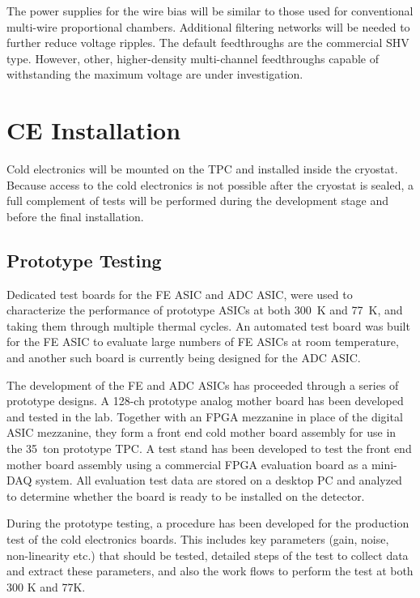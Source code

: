 The power supplies for the wire bias will be similar to 
those used for conventional multi-wire proportional chambers. 
Additional filtering networks will 
be needed to further reduce voltage ripples.  
The default feedthroughs are the commercial SHV type.  
However,  other, higher-density multi-channel 
feedthroughs capable of withstanding the maximum voltage are under investigation.  

%
\section{CE Installation}
\label{sec:ce_install}

Cold electronics will be mounted on the TPC and installed inside the cryostat.
Because access to the cold electronics is not possible after the cryostat is sealed,
a full complement of tests will be performed during the development stage and before the final installation.

\subsection{Prototype Testing}
\label{sec:ce_install_proto}

Dedicated test boards for the FE ASIC and ADC ASIC,
were used to characterize the performance of prototype ASICs at both 300~K and 77~K,
and taking them through multiple thermal cycles.
An automated test board was built for the FE ASIC to evaluate large numbers of FE ASICs at room temperature,
and another such board is currently being designed for the ADC ASIC.

The development of the FE and ADC ASICs has proceeded through a series of prototype designs.
A 128-ch prototype analog mother board has been developed and tested in the lab.
Together with an FPGA mezzanine in place of the digital ASIC mezzanine,
they form a front end cold mother board assembly for use in the 35~ton prototype TPC.
A test stand has been developed to test the front end mother board assembly
using a commercial FPGA evaluation board as a mini-DAQ system.
All evaluation test data are stored on a desktop PC and analyzed to
determine whether the board is ready to be installed on the detector.

During the prototype testing, a procedure has been developed for the production test of the cold electronics boards.
This includes key parameters (gain, noise, non-linearity etc.) that should be tested,
detailed steps of the test to collect data and extract these parameters,
and also the work flows to perform the test at both 300 K and 77K.

